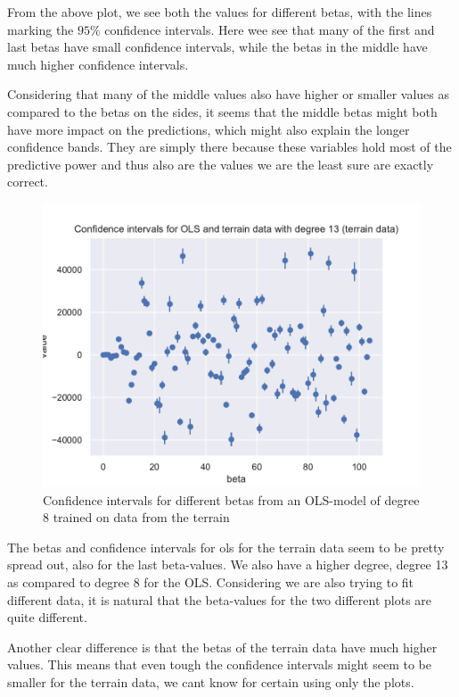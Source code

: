 \documentclass[12pt]{article}
\begin{document}
From the above plot, we see both the values for different betas, with the lines marking the $95\%$ confidence intervals.
Here wee see that many of the first and last betas have small confidence intervals, while the betas in the middle have much higher confidence intervals.

Considering that many of the middle values also have higher or smaller values as compared to the betas on the sides, it seems that the middle betas might both have more impact on the predictions, which might also explain the longer confidence bands.
They are simply there because these variables hold most of the predictive power and thus also are the values we are the least sure are exactly correct.

\begin{figure}[H]
    \centering
    \includegraphics[width=0.8\columnwidth]{../src/output/ols_confidence_intervals_terrain_data.pdf}
    \caption{Confidence intervals for different betas from an OLS-model of degree 8 trained on data from the terrain}
    \label{fig:ols_confidence_intervals_terrain}
\end{figure}

The betas and confidence intervals for ols for the terrain data seem to be pretty spread out, also for the last beta-values.
We also have a higher degree, degree 13 as compared to degree 8 for the OLS.
Considering we are also trying to fit different data, it is natural that the beta-values for the two different plots are quite different.

Another clear difference is that the betas of the terrain data have much higher values.
This means that even tough the confidence intervals might seem to be smaller for the terrain data, we cant know for certain using only the plots.
\end{document}
